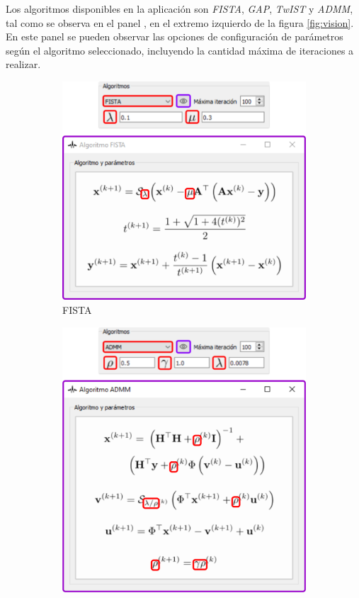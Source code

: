 \documentclass[12pt,twoside,letter]{ol-softwaremanual}
\newcommand*\circled[1]{\tikz[baseline=(char.base)]{
            \node[shape=circle,draw,inner sep=2pt] (char) {#1};}}
\begin{document}
Los algoritmos disponibles en la aplicación son \emph{FISTA}, \emph{GAP}, \emph{TwIST} y \emph{ADMM}, tal como se observa en el panel \circled{3}, en el extremo izquierdo de la figura \ref{fig:vision}. En este panel se pueden observar las opciones de configuración de parámetros según el algoritmo seleccionado, incluyendo la cantidad máxima de iteraciones a realizar. 

\begin{figure}[!ht]
     \centering
     \begin{subfigure}[b]{0.47\textwidth}
         \centering
         \includegraphics[width=\textwidth]{algorithm-fista.png}
         \caption{FISTA}
         \label{fig:fista}
     \end{subfigure}
     \hfill
     \begin{subfigure}[b]{0.47\textwidth}
         \centering
         \includegraphics[width=\textwidth]{algorithm-admm.png}

\end{subfigure}
\end{figure}
\end{document}
